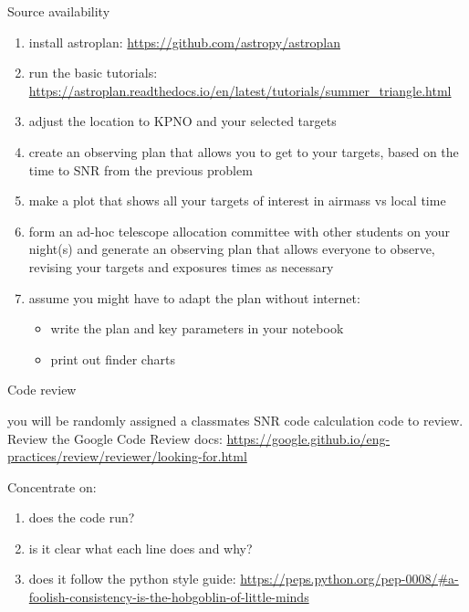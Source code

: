 \begin{frame}{Source availability}

 \begin{enumerate}
 \item install astroplan: \url{https://github.com/astropy/astroplan}
 \item run the basic tutorials: \url{https://astroplan.readthedocs.io/en/latest/tutorials/summer_triangle.html}
 \item adjust the location to KPNO and your selected targets
 \item create an observing plan that allows you to get to your targets, based on the time to SNR from the previous problem
 \item make a plot that shows all your targets of interest in airmass vs local time
 \item form an ad-hoc telescope allocation committee with other students on your night(s) and generate an observing plan that allows everyone to observe, revising your targets and exposures times as necessary 
 \item  assume you might have to adapt the plan without internet:
 \begin{itemize}
    \item write the plan and key parameters in your notebook
     \item print out finder charts
 \end{itemize}
\end{enumerate}
\end{frame}



\begin{frame}{Code review}

you will be randomly assigned a classmates SNR code calculation code to review. 
Review the Google Code Review docs: \url{https://google.github.io/eng-practices/review/reviewer/looking-for.html}

Concentrate on:
 \begin{enumerate}
 \item does the code run?
 \item is it clear what each line does and why?
 \item does it follow the python style guide: \tiny{\url{https://peps.python.org/pep-0008/\#a-foolish-consistency-is-the-hobgoblin-of-little-minds}}
\end{enumerate}

\end{frame}


